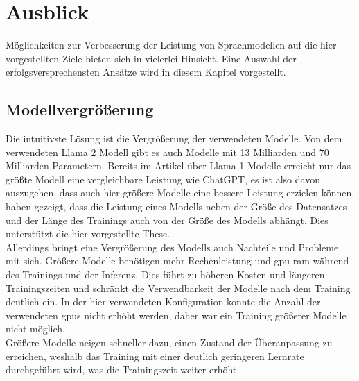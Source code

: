 \chapter{Ausblick}\label{ch:futurework}
Möglichkeiten zur Verbesserung der Leistung von Sprachmodellen auf die hier vorgestellten Ziele bieten sich in vielerlei Hinsicht.
Eine Auswahl der erfolgsversprechensten Ansätze wird in diesem Kapitel vorgestellt.

\section{Modellvergrößerung}
Die intuitivste Lösung ist die Vergrößerung der verwendeten Modelle.
Von dem verwendeten Llama 2 Modell gibt es auch Modelle mit 13 Milliarden und 70 Milliarden Parametern.
Bereits im Artikel \citet{llama} über Llama 1 Modelle erreicht nur das größte Modell eine vergleichbare Leistung wie ChatGPT, es ist also davon auszugehen, dass auch hier größere Modelle eine bessere Leistung erzielen können.
\citet{scaling_laws} haben gezeigt, dass die Leistung eines Modells neben der Größe des Datensatzes und der Länge des Trainings auch von der Größe des Modells abhängt.
Dies unterstützt die hier vorgestellte These.\\

Allerdings bringt eine Vergrößerung des Modells auch Nachteile und Probleme mit sich.
Größere Modelle benötigen mehr Rechenleistung und \ac{gpu}-\ac{ram} während des Trainings und der Inferenz.
Dies führt zu höheren Kosten und längeren Trainingszeiten
und schränkt die Verwendbarkeit der Modelle nach dem Training deutlich ein.
In der hier verwendeten Konfiguration konnte die Anzahl der verwendeten \acp{gpu} nicht erhöht werden,
daher war ein Training größerer Modelle nicht möglich.\\

Größere Modelle neigen schneller dazu, einen Zustand der Überanpassung zu erreichen, weshalb das Training mit einer deutlich geringeren Lernrate durchgeführt wird, was die Trainingszeit weiter erhöht.\\

